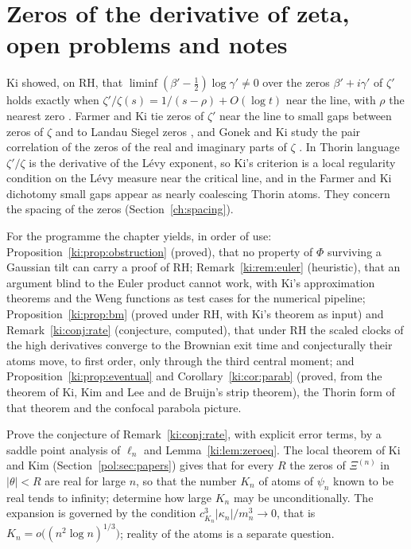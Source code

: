 \section{Zeros of the derivative of zeta, open problems and notes}\label{ki:sec:open}

Ki showed, on RH, that $\liminf(\beta'-\tfrac12)\log\gamma'\ne0$ over the zeros $\beta'+i\gamma'$ of $\zeta'$ holds exactly when $\zeta'/\zeta(s)=1/(s-\rho)+O(\log t)$ near the line, with $\rho$ the nearest zero \cite{Ki08b}. Farmer and Ki tie zeros of $\zeta'$ near the line to small gaps between zeros of $\zeta$ and to Landau Siegel zeros \cite{FarmerKi12}, and Gonek and Ki study the pair correlation of the zeros of the real and imaginary parts of $\zeta$ \cite{GonekKi18}. %
In Thorin language $\zeta'/\zeta$ is the derivative of the L\'evy exponent, so Ki's criterion is a local regularity condition on the L\'evy measure near the critical line, and in the Farmer and Ki dichotomy small gaps appear as nearly coalescing Thorin atoms. They concern the spacing of the zeros (Section~\ref{ch:spacing}).

For the programme the chapter yields, in order of use: Proposition~\ref{ki:prop:obstruction} (proved), that no property of $\Phi$ surviving a Gaussian tilt can carry a proof of RH; Remark~\ref{ki:rem:euler} (heuristic), that an argument blind to the Euler product cannot work, with Ki's approximation theorems and the Weng functions as test cases for the numerical pipeline; Proposition~\ref{ki:prop:bm} (proved under RH, with Ki's theorem as input) and Remark~\ref{ki:conj:rate} (conjecture, computed), that under RH the scaled clocks of the high derivatives converge to the Brownian exit time and conjecturally their atoms move, to first order, only through the third central moment; and Proposition~\ref{ki:prop:eventual} and Corollary~\ref{ki:cor:parab} (proved, from the theorem of Ki, Kim and Lee and de Bruijn's strip theorem), the Thorin form of that theorem and the confocal parabola picture.

\begin{problem}\label{ki:prob:rate}
Prove the conjecture of Remark~\ref{ki:conj:rate}, with explicit error terms, by a saddle point analysis of $\ell_n$ and Lemma~\ref{ki:lem:zeroeq}. The local theorem of Ki and Kim (Section~\ref{pol:sec:papers}) gives that for every $R$ the zeros of $\Xi^{(n)}$ in $|\theta|<R$ are real for large $n$, so that the number $K_n$ of atoms of $\psi_n$ known to be real tends to infinity; determine how large $K_n$ may be unconditionally. The expansion is governed by the condition $c_{K_n}^3|\kappa_n|/m_n^3\to0$, that is $K_n=o\bigl((n^2\log n)^{1/3}\bigr)$; reality of the atoms is a separate question.
\end{problem}

